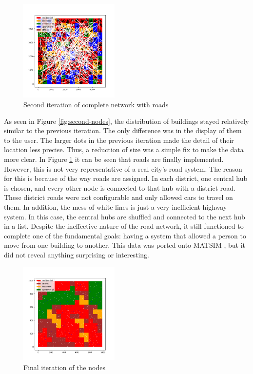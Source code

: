 \documentclass[11pt]{article}
\begin{document}
\begin{multicols}{2}
    \begin{figure}[H]
        \centering
        \vspace{-1em}
        \includegraphics[width=0.44\textwidth]{images/secondzoningwnetwork.png}
        \caption{Second iteration of complete network with roads}
        \label{fig:second-network}
    \end{figure}

    \quad As seen in Figure \ref{fig:second-nodes}, the distribution of buildings stayed relatively similar to the previous iteration. The only difference was in the display of them to the user. The larger dots in the previous iteration made the detail of their location less precise. Thus, a reduction of size was a simple fix to make the data more clear. In Figure \ref{fig:second-network} it can be seen that roads are finally implemented. However, this is not very representative of a real city's road system. The reason for this is because of the way roads are assigned. In each district, one central hub is chosen, and every other node is connected to that hub with a district road. These district roads were not configurable and only allowed cars to travel on them. In addition, the mess of white lines is just a very inefficient highway system. In this case, the central hubs are shuffled and connected to the next hub in a list. Despite the ineffective nature of the road network, it still functioned to complete one of the fundamental goals: having a system that allowed a person to move from one building to another. This data was ported onto MATSIM \cite{matsim}, but it did not reveal anything surprising or interesting. \\

    \begin{figure}[H]
        \centering
        \includegraphics[width=0.44\textwidth]{images/finalzoningwnodes.png}
        \caption{Final iteration of the nodes}
        \label{fig:final-zoning-nodes}
    \end{figure}


\end{multicols}
\end{document}

